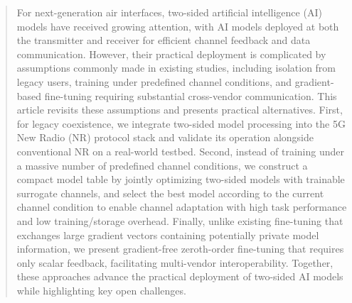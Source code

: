 \documentclass[10pt,twocolumn]{IEEEtran}
\begin{document}
\begin{abstract} %
For next-generation air interfaces, two-sided artificial intelligence (AI) models have received growing attention, with AI models deployed at both the transmitter and receiver for efficient channel feedback and data communication. However, their practical deployment is complicated by assumptions commonly made in existing studies, including isolation from legacy users, training under predefined channel conditions, and gradient-based fine-tuning requiring substantial cross-vendor communication. This article revisits these assumptions and presents practical alternatives. First, for legacy coexistence, we integrate two-sided model processing into the 5G New Radio (NR) protocol stack and validate its operation alongside conventional NR on a real-world testbed. 
Second, instead of training under a massive number of predefined channel conditions, we construct a compact model table by jointly optimizing two-sided models with trainable surrogate channels, and select the best model according to the current channel condition to enable channel adaptation with high task performance and low training/storage overhead. 
Finally, unlike existing fine-tuning that exchanges large gradient vectors containing potentially private model information, we present gradient-free zeroth-order fine-tuning that requires only scalar feedback, facilitating multi-vendor interoperability. Together, these approaches advance the practical deployment of two-sided AI models while highlighting key open challenges.

\end{abstract}
\end{document}
